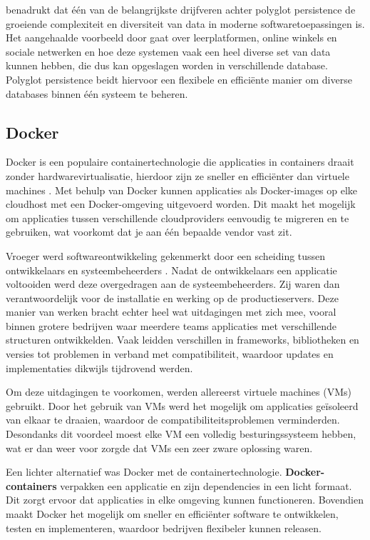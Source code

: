 \textcite{Candel2022} benadrukt dat één van de belangrijkste drijfveren achter polyglot persistence de groeiende complexiteit en diversiteit van data in moderne softwaretoepassingen is. Het aangehaalde voorbeeld door \textcite{Candel2022} gaat over leerplatformen, online winkels en sociale netwerken en hoe deze systemen vaak een heel diverse set van data kunnen hebben, die dus kan opgeslagen worden in verschillende database. Polyglot persistence beidt  hiervoor een flexibele en efficiënte manier om diverse databases binnen één systeem te beheren.

\subsection{Docker}

Docker is een populaire containertechnologie die applicaties in containers draait zonder hardwarevirtualisatie, hierdoor zijn ze sneller en efficiënter dan virtuele machines \autocite{Kim2022}. Met behulp van Docker kunnen applicaties als Docker-images op elke cloudhost met een Docker-omgeving uitgevoerd worden. Dit maakt het mogelijk om applicaties tussen verschillende cloudproviders eenvoudig te migreren en te gebruiken, wat voorkomt dat je aan één bepaalde vendor vast zit.\newline

Vroeger werd softwareontwikkeling gekenmerkt door een scheiding tussen ontwikkelaars en systeembeheerders \autocite{Schenker2023}. Nadat de ontwikkelaars een applicatie voltooiden werd deze overgedragen aan de systeembeheerders. Zij waren dan verantwoordelijk voor de installatie en werking op de productieservers. Deze manier van werken bracht echter heel wat uitdagingen met zich mee, vooral binnen grotere bedrijven waar meerdere teams applicaties met verschillende structuren ontwikkelden. Vaak leidden verschillen in frameworks, bibliotheken en versies tot problemen in verband met compatibiliteit, waardoor updates en implementaties dikwijls tijdrovend werden.

Om deze uitdagingen te voorkomen, werden allereerst virtuele machines (VMs) gebruikt. Door het gebruik van VMs werd het mogelijk om applicaties geïsoleerd van elkaar te draaien, waardoor de compatibiliteitsproblemen verminderden. Desondanks dit voordeel moest elke VM een volledig besturingssysteem hebben, wat er dan weer voor zorgde dat VMs een zeer zware oplossing waren.

Een lichter alternatief was Docker met de containertechnologie. \textbf{Docker-containers} verpakken een applicatie en zijn dependencies in een licht formaat. Dit zorgt ervoor dat applicaties in elke omgeving kunnen functioneren. Bovendien maakt Docker het mogelijk om sneller en efficiënter software te ontwikkelen, testen en implementeren, waardoor bedrijven flexibeler kunnen releasen.\newline

